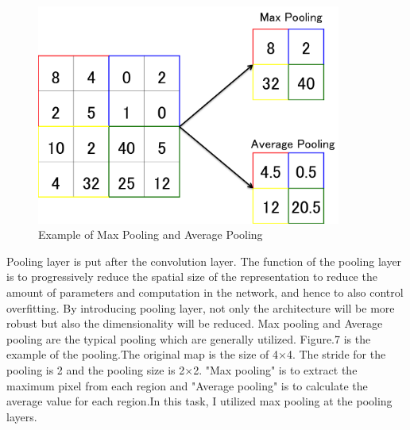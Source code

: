 \begin{figure}[H]

	\begin{center}
	\includegraphics[width=10cm]{picture/Pooling.png}
	\caption{Example of Max Pooling and Average Pooling}
	\end{center}
	\label{fig:seven}

\end{figure}









Pooling layer is put after the convolution layer. %
The function of the pooling layer is to progressively reduce the spatial size of the representation to reduce the amount of parameters and computation in the network, and hence to also control overfitting.
By introducing pooling layer, not only the architecture will be more robust but also the dimensionality will be reduced. Max pooling and Average pooling are the typical pooling which are generally utilized. Figure.7 is the example of the pooling.The original map is the size of 4$\times$4. The stride for the pooling is 2 and the pooling size is 2$\times$2. "Max pooling" is to extract the maximum pixel from each region and "Average pooling" is to calculate the average value for each region.In this task, I utilized max pooling at the pooling layers.


